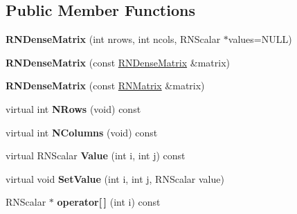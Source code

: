 \subsection*{Public Member Functions}
\begin{DoxyCompactItemize}
\item 
{\bfseries R\+N\+Dense\+Matrix} (int nrows, int ncols, R\+N\+Scalar $\ast$values=N\+U\+LL)\hypertarget{class_r_n_dense_matrix_aeec9f5769a0dca153d0e4f4dd0661ff4}{}\label{class_r_n_dense_matrix_aeec9f5769a0dca153d0e4f4dd0661ff4}

\item 
{\bfseries R\+N\+Dense\+Matrix} (const \hyperlink{class_r_n_dense_matrix}{R\+N\+Dense\+Matrix} \&matrix)\hypertarget{class_r_n_dense_matrix_a1aec5e00c6ce23ea95dd13bc1ab9e1b4}{}\label{class_r_n_dense_matrix_a1aec5e00c6ce23ea95dd13bc1ab9e1b4}

\item 
{\bfseries R\+N\+Dense\+Matrix} (const \hyperlink{class_r_n_matrix}{R\+N\+Matrix} \&matrix)\hypertarget{class_r_n_dense_matrix_aab0bb0367e3c5584676852a44bde8d4c}{}\label{class_r_n_dense_matrix_aab0bb0367e3c5584676852a44bde8d4c}

\item 
virtual int {\bfseries N\+Rows} (void) const \hypertarget{class_r_n_dense_matrix_a32229810ddc5ac571d39aa7d2a90dde6}{}\label{class_r_n_dense_matrix_a32229810ddc5ac571d39aa7d2a90dde6}

\item 
virtual int {\bfseries N\+Columns} (void) const \hypertarget{class_r_n_dense_matrix_a0fb4660d5a0ee8f9a9096a002bfd0315}{}\label{class_r_n_dense_matrix_a0fb4660d5a0ee8f9a9096a002bfd0315}

\item 
virtual R\+N\+Scalar {\bfseries Value} (int i, int j) const \hypertarget{class_r_n_dense_matrix_a5a303e1403b76f24dcef1b590b22ca5b}{}\label{class_r_n_dense_matrix_a5a303e1403b76f24dcef1b590b22ca5b}

\item 
virtual void {\bfseries Set\+Value} (int i, int j, R\+N\+Scalar value)\hypertarget{class_r_n_dense_matrix_a0897933a96bd3316fd199354daabc7c2}{}\label{class_r_n_dense_matrix_a0897933a96bd3316fd199354daabc7c2}

\item 
R\+N\+Scalar $\ast$ {\bfseries operator\mbox{[}$\,$\mbox{]}} (int i) const \hypertarget{class_r_n_dense_matrix_ac816a6f1c0f223c45b76326a42cd1d17}{}\label{class_r_n_dense_matrix_ac816a6f1c0f223c45b76326a42cd1d17}


\end{DoxyCompactItemize}
